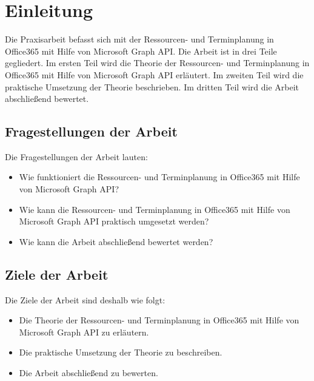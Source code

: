 


        \section{Einleitung}
Die Praxisarbeit befasst sich mit der Ressourcen- und Terminplanung in Office365 mit Hilfe von Microsoft Graph API. Die Arbeit ist in drei Teile gegliedert. Im ersten Teil wird die Theorie der Ressourcen- und Terminplanung in Office365 mit Hilfe von Microsoft Graph API erläutert. Im zweiten Teil wird die praktische Umsetzung der Theorie beschrieben. Im dritten Teil wird die Arbeit abschließend bewertet.
    \newline
    \subsection{Fragestellungen der Arbeit}
    Die Fragestellungen der Arbeit lauten:
    \begin{itemize}
        \item Wie funktioniert die Ressourcen- und Terminplanung in Office365 mit Hilfe von Microsoft Graph API?
        \item Wie kann die Ressourcen- und Terminplanung in Office365 mit Hilfe von Microsoft Graph API praktisch umgesetzt werden?
        \item Wie kann die Arbeit abschließend bewertet werden?
    \end{itemize}
    \subsection{Ziele der Arbeit}
    Die Ziele der Arbeit sind deshalb wie folgt:
    \begin{itemize}
        \item Die Theorie der Ressourcen- und Terminplanung in Office365 mit Hilfe von Microsoft Graph API zu erläutern.
        \item Die praktische Umsetzung der Theorie zu beschreiben.
        \item Die Arbeit abschließend zu bewerten.
    \end{itemize}


